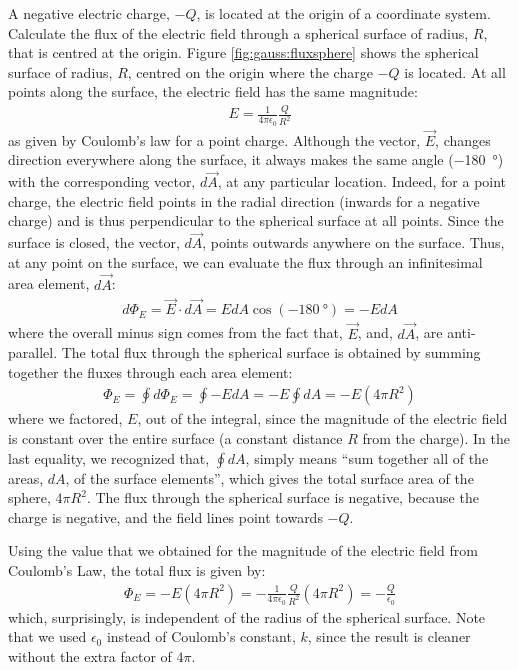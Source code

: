 \begin{example}{A negative electric charge, $-Q$, is located at the origin of a coordinate system. Calculate the flux of the electric field through a spherical surface of radius, $R$, that is centred at the origin.}\label{ex:gauss:qsphere}
Figure \ref{fig:gauss:fluxsphere} shows the spherical surface of radius, $R$, centred on the origin where the charge $-Q$ is located.
At all points along the surface, the electric field has the same magnitude:
\begin{align*}
E=\frac{1}{4\pi\epsilon_0}\frac{Q}{R^2}
\end{align*}
as given by Coulomb's law for a point charge. Although the vector, $\vec E$, changes direction everywhere along the surface, it always makes the same angle (\SI{-180}{\degree}) with the corresponding vector, $d\vec A$, at any particular location. Indeed, for a point charge, the electric field points in the radial direction (inwards for a negative charge) and is thus perpendicular to the spherical surface at all points. Since the surface is closed, the vector, $d\vec A$, points outwards anywhere on the surface. Thus, at any point on the surface, we can evaluate the flux through an infinitesimal area element, $d\vec A$:
\begin{align*}
d\Phi_E=\vec E\cdot d\vec A=EdA\cos(\SI{-180}{\degree})=-EdA
\end{align*}
where the overall minus sign comes from the fact that, $\vec E$, and, $d\vec A$, are anti-parallel. The total flux through the spherical surface is obtained by summing together the fluxes through each area element:
\begin{align*}
\Phi_E=\oint d\Phi_E=\oint -EdA=-E\oint dA=-E(4\pi R^2)
\end{align*}
where we factored, $E$, out of the integral, since the magnitude of the electric field is constant over the entire surface (a constant distance $R$ from the charge). In the last equality, we recognized that, $\oint dA$, simply means ``sum together all of the areas, $dA$, of the surface elements'', which gives the total surface area of the sphere, $4\pi R^2$. The flux through the spherical surface is negative, because the charge is negative, and the field lines point towards $-Q$.

Using the value that we obtained for the magnitude of the electric field from Coulomb's Law, the total flux is given by:
\begin{align*}
\Phi_E=-E(4\pi R^2)=-\frac{1}{4\pi\epsilon_0}\frac{Q}{R^2}(4\pi R^2)=-\frac{Q}{\epsilon_0}
\end{align*}
which, surprisingly, is independent of the radius of the spherical surface. Note that we used $\epsilon_0$ instead of Coulomb's constant, $k$, since the result is cleaner without the extra factor of $4\pi$. 


\end{example}
